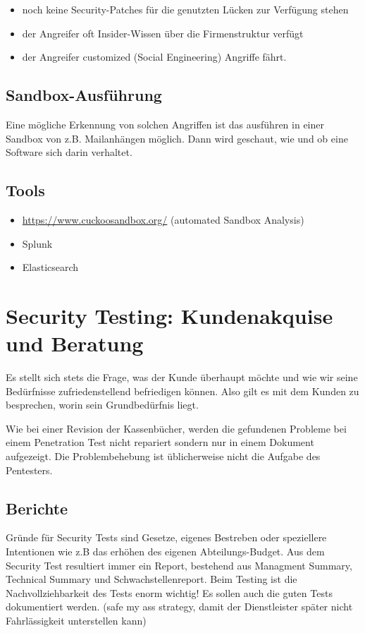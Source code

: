 \begin{itemize}
	\item noch keine Security-Patches für die genutzten Lücken zur Verfügung stehen
	\item der Angreifer oft Insider-Wissen über die Firmenstruktur verfügt
	\item der Angreifer customized (Social Engineering) Angriffe fährt.
\end{itemize}

\subsection{Sandbox-Ausführung}

Eine mögliche Erkennung von solchen Angriffen ist das ausführen in einer Sandbox von z.B. Mailanhängen möglich. Dann wird geschaut, wie und ob eine Software sich darin verhaltet.

\subsection{Tools}

\begin{itemize}
	\item \url{https://www.cuckoosandbox.org/} (automated Sandbox Analysis)
	\item Splunk
	\item Elasticsearch
\end{itemize}


\section{Security Testing: Kundenakquise und Beratung}
Es stellt sich stets die Frage, was der Kunde überhaupt möchte und wie wir seine Bedürfnisse zufriedenstellend befriedigen können. Also gilt es mit dem Kunden zu besprechen, worin sein Grundbedürfnis liegt. 

Wie bei einer Revision der Kassenbücher, werden die gefundenen Probleme bei einem Penetration Test nicht repariert sondern nur in einem Dokument aufgezeigt. Die Problembehebung ist üblicherweise nicht die Aufgabe des Pentesters.

\subsection{Berichte}
Gründe für Security Tests sind Gesetze, eigenes Bestreben oder speziellere Intentionen wie z.B das erhöhen des eigenen Abteilungs-Budget. Aus dem Security Test resultiert immer ein Report, bestehend aus Managment Summary, Technical Summary und Schwachstellenreport. Beim Testing ist die Nachvollziehbarkeit des Tests enorm wichtig! Es sollen auch die guten Tests dokumentiert werden. (safe my ass strategy, damit der Dienstleister später nicht Fahrlässigkeit unterstellen kann)

